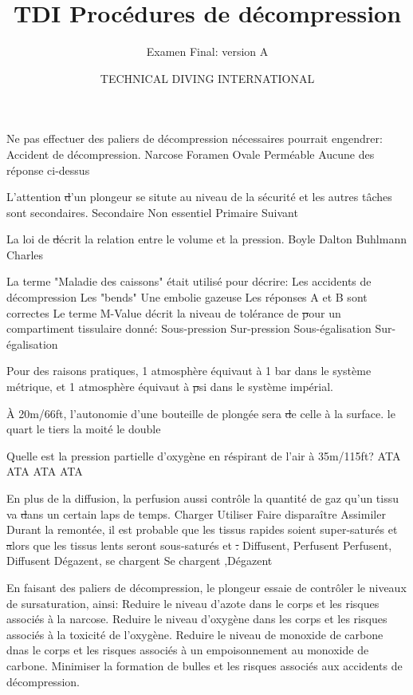 \documentclass[english,10pt,twoside]{article}
\title{TDI Procédures de décompression}
\subtitle{Examen Final: version A}
\author{TECHNICAL DIVING INTERNATIONAL}
\begin{document}
\sloppy


	\begin{outline}
		\1 Ne pas effectuer des paliers de décompression nécessaires pourrait engendrer:
			\2 Accident de décompression.
			\2 Narcose
			\2 Foramen Ovale Perméable
			\2 Aucune des réponse ci-dessus

		\1 L'attention \st d'un plongeur se situte au niveau de la sécurité et les autres tâches sont secondaires.
			\2 Secondaire
			\2 Non essentiel
			\2 Primaire
			\2 Suivant

		\1 La loi de \st décrit la relation entre le volume et la pression.
			\2 Boyle
			\2 Dalton
			\2 Buhlmann
			\2 Charles

		\1 La terme "Maladie des caissons" était utilisé pour décrire:
			\2 Les accidents de décompression
			\2 Les "bends"
			\2 Une embolie gazeuse
			\2 Les réponses A et B sont correctes
		\1 Le terme M-Value décrit la niveau de tolérance de \st pour un compartiment tissulaire donné:
			\2 Sous-pression
			\2 Sur-pression
			\2 Sous-égalisation
			\2 Sur-égalisation

		\1 Pour des raisons pratiques, 1 atmosphère équivaut à 1 bar dans le système métrique, et 1 atmosphère équivaut à \st psi dans le système impérial.

		\1 À 20m/66ft, l'autonomie d'une bouteille de plongée sera \st de celle à la surface.
			\2 le quart
			\2 le tiers
			\2 la moité
			\2 le double

		\1 Quelle est la pression partielle d'oxygène en réspirant de l'air à 35m/115ft?
			 ATA
			 ATA
			 ATA
			 ATA

		\1 En plus de la diffusion, la perfusion aussi contrôle la quantité de gaz qu'un tissu va \st dans un certain laps de temps.
			\2 Charger
			\2 Utiliser
			\2 Faire disparaître
			\2 Assimiler
		\1 Durant la remontée, il est probable que les tissus rapides soient super-saturés et \st alors que les tissus lents seront sous-saturés et \st.
			\2 Diffusent, Perfusent
			\2 Perfusent, Diffusent
			\2 Dégazent, se chargent
			\2 Se chargent ,Dégazent

		\1 En faisant des paliers de décompression, le plongeur essaie de contrôler le niveaux de sursaturation, ainsi:
			\2 Reduire le niveau d'azote dans le corps et les risques associés à la narcose.
			\2 Reduire le niveau d'oxygène dans les corps et les risques associés à la toxicité de l'oxygène.
			\2 Reduire le niveau de monoxide de carbone dnas le corps et les risques associés à un empoisonnement au monoxide de carbone.
			\2 Minimiser la formation de bulles et les risques associés aux accidents de décompression.


\end{outline}
\end{document}
